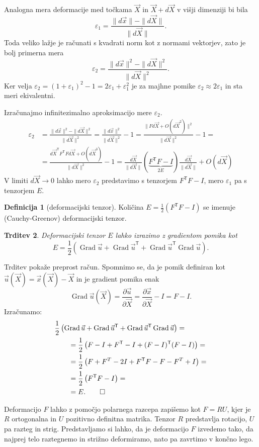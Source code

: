 \documentclass[12pt,a4paper]{article}
\theoremstyle{definition} %
\newtheorem{definicija}{Definicija}[section]
\theoremstyle{plain} %
\newtheorem{trditev}[definicija]{Trditev}
\numberwithin{equation}{section}
\newcommand{\T}{\mathsf{T}}
\newcommand{\Grad}{\operatorname{Grad}}
\newcommand{\eps}{\varepsilon}
\newcommand{\dpar}[2]{\ensuremath{\frac{\partial #1}{\partial #2}}}
\newcommand{\vu}{\vec{u}}
\newcommand{\vX}{\vec{X}}
\newcommand{\vx}{\vec{x}}
\begin{document}
Analogna mera deformacije med točkama $\vX$ in $\vX+d\vX$ v višji dimenziji bi bila
\[
  \eps_1 = \frac{\|d\vx\| - \|d\vX\|}{\|d\vX\|}.
\]
Toda veliko lažje je računati s kvadrati norm kot z normami vektorjev, zato je
bolj primerna mera
\[
  \eps_2 = \frac{\|d\vx\|^2 - \|d\vX\|^2}{\|d\vX\|^2}.
\]
Ker velja $\eps_2 = (1+\eps_1)^2 - 1 = 2\eps_1 + \eps_1^2$ je za majhne pomike
$\eps_2 \approx 2\eps_1$ in sta meri ekivalentni.

Izračunajmo infinitezimalno aproksimacijo mere $\eps_2$.
\begin{align*}
  \eps_2 &=
  \frac{\|d\vx\|^2 - \|d\vX\|^2}{\|d\vX\|^2} =
  \frac{\|d\vx\|^2}{\|d\vX\|^2}  - 1=
  \frac{\|F d\vX + O(d\vX^2)\|^2}{\|d\vX\|^2} - 1 = \\ &=
  \frac{d\vX^\T F^\T F d\vX + O(d\vX^3)}{\|d\vX\|^2} - 1 =
  \frac{d\vX}{\|d\vX\|}(\underbrace{F^\T F - I}_{2E})\frac{d\vX}{\|d\vX\|} + O(d\vX)
\end{align*}
V limiti $d\vX \to 0$ lahko mero $\eps_2$ predstavimo s tenzorjem $F^\T F- I$,
mero $\eps_1$ pa s tenzorjem $E$.

\begin{definicija}[deformacijski tenzor]
  Količina $E = \frac12 (F^\T F - I)$ se imenuje (Cauchy-Greenov)
  deformacijski tenzor.
\end{definicija}
\begin{trditev}
  Deformacijski tenzor $E$ lahko izrazimo z gradientom pomika kot
  \[ E = \frac12\left( \Grad \vu + \Grad \vu^\T + \Grad \vu^\T \Grad \vu \right). \]
\end{trditev}
\proof
Trditev pokaže preprost račun. Spomnimo se, da je pomik definiran kot $\vu(\vX) =
\vx(\vX) - \vX$ in je gradient pomika enak
\[
  \Grad \vu(\vX) = \dpar{\vu}{\vX} = \dpar{\vx}{\vX} - I = F - I.
\]
Izračunamo:
\begin{align*}
  &\frac12\left( \Grad \vu + \Grad \vu^\T + \Grad \vu^\T \Grad \vu \right) = \\
  &\qquad=\frac12\left(F - I + F^\T - I  + (F-I)^\T(F-I)\right) = \\
  &\qquad=\frac12\left(F + F^T - 2I + F^\T F - F - F^T + I\right) = \\
  &\qquad=\frac12\left(F^\T F - I\right) = \\
  &\qquad=E.\qedhere
\end{align*}
\endproof

Deformacijo $F$ lahko z pomočjo polarnega razcepa zapišemo kot $F = RU$, kjer je
$R$ ortogonalna in $U$ pozitivno definitna matrika. Tenzor $R$ predstavlja
rotacijo, $U$ pa razteg in strig. Predstavljamo si lahko, da je deformacijo $F$
izvedemo tako, da najprej telo raztegnemo in strižno deformiramo, nato pa
zavrtimo v končno lego.
\end{document}
